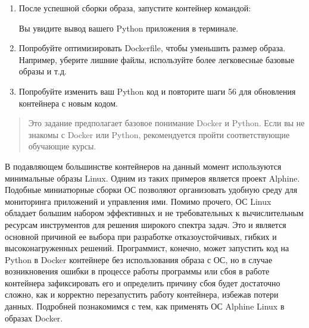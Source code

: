 \documentclass[letterpaper,10pt,russian]{sphinxmanual}
\begin{document}
\begin{enumerate}
\sphinxAtStartPar
Где «my\sphinxhyphen{}python\sphinxhyphen{}app» \sphinxhyphen{} это имя образа, а точка означает текущую директорию.

\item {} 
\sphinxAtStartPar
{} После успешной сборки образа, запустите контейнер командой:

\begin{sphinxVerbatim}[commandchars=\\\{\}]
  
\end{sphinxVerbatim}

\sphinxAtStartPar
Вы увидите вывод вашего Python приложения в терминале.

\item {} 
\sphinxAtStartPar
{} Попробуйте оптимизировать Dockerfile, чтобы уменьшить размер образа. Например, уберите лишние файлы, используйте более легковесные базовые образы и т.д.

\item {} 
\sphinxAtStartPar
{} Попробуйте изменить ваш Python код и повторите шаги 5\sphinxhyphen{}6 для обновления контейнера с новым кодом.

\end{enumerate}
\begin{quote}

\sphinxAtStartPar
{} Это задание предполагает базовое понимание Docker и Python. Если вы не знакомы с Docker или Python, рекомендуется пройти соответствующие обучающие курсы.
\end{quote}

\sphinxAtStartPar
В подавляющем большинстве контейнеров на данный момент используются минимальные образы Linux. Одним из таких примеров является проект Alphine. Подобные миниатюрные сборки ОС позволяют организовать удобную среду для мониторинга приложений и управления ими. Помимо прочего, ОС Linux обладает большим набором эффективных и не требовательных к вычислительным ресурсам инструментов для решения широкого спектра задач. Это и является основной причиной ее выбора при разработке отказоустойчивых, гибких и высоконагруженных решений. Программист, конечно, может запустить код на Python в Docker контейнере без использования образа с ОС, но в случае возникновения ошибки в процессе работы программы или сбоя в работе контейнера зафиксировать его и определить причину сбоя будет достаточно сложно, как и корректно перезапустить работу контейнера, избежав потери данных. Подробней познакомимся с тем, как применять ОС Alphine Linux в образах Docker.
\end{document}
